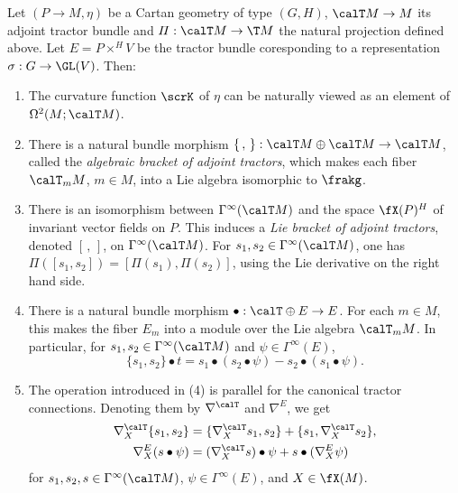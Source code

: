 \begin{prop}\label{prop 1.5.7 Cap}
    Let $(P\to M,\eta)$ be a Cartan geometry of type $(G,H)$, $\calT M\to M$ its adjoint tractor bundle and $\varPi:\calT M\to \T M$ the natural projection defined above. Let $E=P\times^H V$ be the tractor bundle coresponding to a representation $\sigma:G\to\GL(V)$. Then:
    \begin{enumerate}[label=(\arabic*)]
        \item The curvature function $\scrK$ of $\eta$ can be naturally viewed as an element of $\Omega^2(M;\calT M)$.
        \item There is a natural bundle morphism $\{\,,\,\}:\calT M\oplus\calT M\to \calT M$, called the \emph{algebraic bracket of adjoint tractors}, which makes each fiber $\calT_m M$, $m\in M$, into a Lie algebra isomorphic to $\frakg$.
        \item There is an isomorphism between $\Gamma^\infty(\calT M)$ and the space $\fX(P)^H$ of invariant vector fields on $P$. This induces a \emph{Lie bracket of adjoint tractors}, denoted $[\,,\,]$, on $\Gamma^\infty(\calT M)$. For $s_1,s_2\in\Gamma^\infty(\calT M)$, one has $\varPi([s_1,s_2])=[\varPi(s_1),\varPi(s_2)]$, using the Lie derivative on the right hand side.
        \item There is a natural bundle morphism $\bullet:\calT\oplus E\to E$. For each $m\in M$, this makes the fiber $E_m$ into a module over the Lie algebra $\calT_m M$. In particular, for $s_1,s_2\in\Gamma^\infty(\calT M)$ and $\psi\in \Gamma^\infty(E)$, 
        \[\{s_1,s_2\}\bullet t=s_1\bullet(s_2\bullet \psi)-s_2\bullet(s_1\bullet \psi).\]
        \item The operation introduced in (4) is parallel for the canonical tractor connections. Denoting them by $\nabla^\calT$ and $\nabla^E$, we get 
        \begin{align}
            \nabla^\calT_X\{s_1,s_2\}&=\{\nabla^\calT_X s_1,s_2\}+\{s_1,\nabla^\calT_X s_2\},\\
            \nabla^E_X(s\bullet \psi)&=(\nabla^\calT_X s)\bullet \psi+s\bullet (\nabla^E_X \psi)
        \end{align}
        for $s_1,s_2,s\in\Gamma^\infty(\calT M)$, $\psi\in\Gamma^\infty(E)$, and $X\in\fX(M)$.
    \end{enumerate}
\end{prop}
